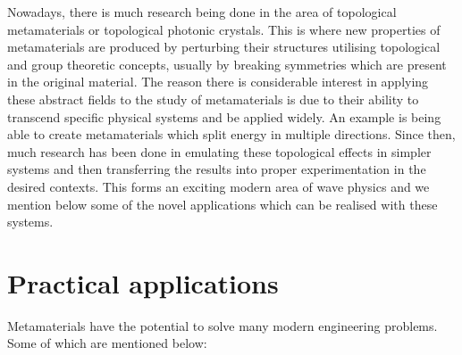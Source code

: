 Nowadays, there is much research being done in the area of topological
metamaterials or topological photonic
crystals.\cite{topoedge,toposplit,topomet} This is where new properties of
metamaterials are produced by perturbing their structures utilising topological
and group theoretic concepts, usually by breaking symmetries which are present
in the original material. The reason there is considerable interest in applying
these abstract fields to the study of metamaterials is due to their ability to
transcend specific physical systems and be applied widely. An example is being
able to create metamaterials which split energy in multiple
directions.\cite{toposplit} Since then, much research has been done in
emulating these topological effects in simpler systems and then transferring
the results into proper experimentation in the desired
contexts.\cite{elasticvhe,singlevalley,exobs,exobs2} This forms an exciting
modern area of wave physics and we mention below some of the novel applications
which can be realised with these systems.

\section{Practical applications}
\label{applications}
Metamaterials have the potential to solve many modern engineering problems.
Some of which are mentioned below:

